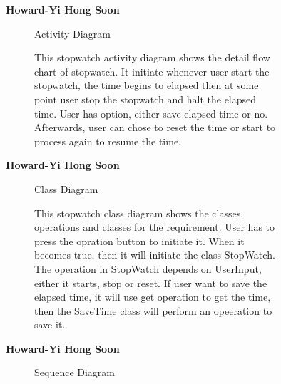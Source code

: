 \documentclass{article}
\begin{document}
	
	

		\begin{figure}[htbp]
			\textbf{Howard-Yi Hong Soon}
			\centering
			\begin{subfigure}{\textwidth}
				\resizebox{\textwidth}{!}{}
				\caption{Activity Diagram}
			\end{subfigure}
			\begin{subfigure}{\textwidth}
				This stopwatch activity diagram shows the detail flow chart of stopwatch. It initiate whenever user start the stopwatch, the time begins to elapsed
				then at some point user stop the stopwatch and halt the elapsed time. User has option, either save elapsed time or no. Afterwards, user can 
				chose to reset the time or start to process again to resume the time.
			\end{subfigure}
		\end{figure}
		
		

		\begin{figure}[htbp]
			\textbf{Howard-Yi Hong Soon}
			\centering
			\begin{subfigure}{\textwidth}
				\resizebox{\textwidth}{!}{}
				\caption{Class Diagram}
			\end{subfigure}
			\begin{subfigure}{\textwidth}
				This stopwatch class diagram shows the classes, operations and classes for the requirement. User has to press 
				the opration button to initiate it. When it becomes true, then it will initiate the class StopWatch. The operation in StopWatch depends on 
				UserInput, either it starts, stop or reset. If user want to save the elapsed time, it will use get operation to get the time,
				then the SaveTime class will perform an opeeration to save it. 
			\end{subfigure}
		\end{figure}

		
		

		\begin{figure}[htbp]
			\textbf{Howard-Yi Hong Soon}
			\centering
			\begin{subfigure}{\textwidth}
				\resizebox{\textwidth}{!}{}
				\caption{Sequence Diagram}
			\end{subfigure}
			\begin{subfigure}{\textwidth}

			\end{subfigure}
		\end{figure}
		\newpage
\end{document}
